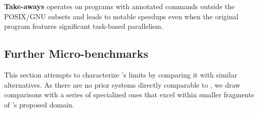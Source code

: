 \documentclass[letterpaper,twocolumn,10pt]{article}
\newcommand{\heading}[1]{\vspace{4pt}\noindent\textbf{#1}\enspace}
\newcommand{\cn}[1]{\mbox{\textcircled{\footnotesize #1}}}
\newcommand{\sta}{\cn{\textsc{S}}\xspace}
\newcommand{\pur}{\cn{\textsc{P}}\xspace}
\newcommand{\dfs}{\cn{\textsc{F}}\xspace}
\newcommand{\kk}[1]{[{\color{magenta}kk: #1}]}
\begin{document}
\heading{Take-aways}
\sys operates on programs with annotated commands outside the POSIX/GNU subsets and leads to notable speedups even when the original program features significant task-based parallelism.

% 
% 
% 
% 

\subsection{Further Micro-benchmarks}
\label{micro}


This section attempts to characterize \sys's limits by comparing it with similar alternatives.
As there are no prior systems directly comparable to \sys, we draw comparisons with a series of specialized ones that excel within smaller fragments of \sys's proposed domain.
\end{document}
